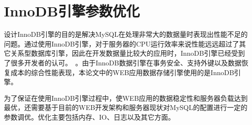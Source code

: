 \section{InnoDB引擎参数优化}

设计InnoDB引擎的目的是解决MySQL在处理非常大的数据量时表现出性能不足的问题。通过使用InnoDB引擎，对于服务器的CPU运行效率来说性能远远超过了其它关系型数据库引擎，因此在开发数据量比较大的应用时，InnoDB引擎已经受到了很多开发者的认可。~\cite{schwartz2012high}。由于InnoDB数据引擎在事务安全、支持外键以及数据恢复成本的综合性能表现，本论文中的WEB应用数据存储引擎使用的是InnoDB引擎。

为了保证在使用InnoDB引擎过程中，使WEB应用的数据稳定性和服务器负载达到最优，还需要基于目前的WEB开发架构和服务器现状对MySQL的配置进行一定的参数调优。优化主要包括内存、IO、日志以及其它方面\cite{顾治华2006mysql}。

